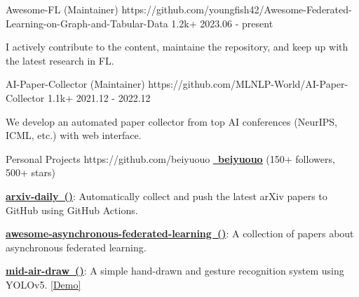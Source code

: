 \begin{cventries}

\cvproject
{Awesome-FL (Maintainer)} %
{https://github.com/youngfish42/Awesome-Federated-Learning-on-Graph-and-Tabular-Data}
{1.2k+} %
{2023.06 - present} %
{
\begin{cvitems} %
\item {I actively contribute to the content, maintaine the repository, and keep up with the latest research in FL. }
\end{cvitems}
} %



\cvproject
{AI-Paper-Collector (Maintainer)} %
{https://github.com/MLNLP-World/AI-Paper-Collector}
{1.1k+} %
{2021.12 - 2022.12} %
{
\begin{cvitems} %
\item {We develop an automated paper collector from top AI conferences (NeurIPS, ICML, etc.) with web interface.}
\end{cvitems}
} %


\cvproject
{Personal Projects} %
{https://github.com/beiyuouo} %
{} %
{\href{https://github.com/beiyuouo}{\textcolor{text}{\faGithub~\textbf{\underline{beiyuouo}}}} (150+ followers, 500+ stars)} %
{
\begin{cvitems} %
\item {\href{https://github.com/beiyuouo/arxiv-daily}{\textbf{arxiv-daily~()}}: Automatically collect and push the latest arXiv papers to GitHub using GitHub Actions.}
\item {\href{https://github.com/beiyuouo/awesome-asynchronous-federated-learning}{\textbf{awesome-asynchronous-federated-learning~()}}: A collection of papers about asynchronous federated learning.}
\item {\href{https://github.com/beiyuouo/mid-air-draw}{\textbf{mid-air-draw~()}}: A simple hand-drawn and gesture recognition system using YOLOv5. \textcolor{awesome-red}{\href{https://www.bilibili.com/video/BV15V411a7WB/}{[Demo]}}}
\end{cvitems}
} %


\end{cventries}

